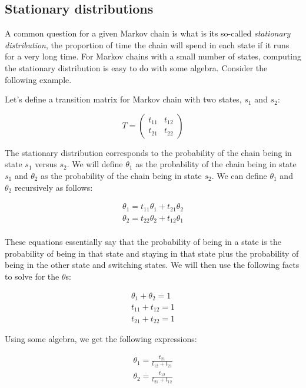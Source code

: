 \documentclass[
  letterpaper,
  DIV=11,
  numbers=noendperiod]{scrreprt}
\begin{document}
\subsection{Stationary distributions}\label{stationary-distributions}

A common question for a given Markov chain is what is its so-called
\emph{stationary distribution}, the proportion of time the chain will
spend in each state if it runs for a very long time. For Markov chains
with a small number of states, computing the stationary distribution is
easy to do with some algebra. Consider the following example.

Let's define a transition matrix for Markov chain with two states,
\(s_1\) and \(s_2\):

\[
\begin{equation}
T = \left(
\begin{matrix}
t_{11} & t_{12} \\
t_{21} & t_{22}
\end{matrix} \right)
\end{equation}
\]

The stationary distribution corresponds to the probability of the chain
being in state \(s_1\) versus \(s_2\). We will define \(\theta_1\) as
the probability of the chain being in state \(s_1\) and \(\theta_2\) as
the probability of the chain being in state \(s_2\). We can define
\(\theta_1\) and \(\theta_2\) recursively as follows:

\[
\begin{eqnarray}
\theta_1 = t_{11} \theta_1 + t_{21} \theta_2 \\
\theta_2 = t_{22} \theta_2 + t_{12} \theta_1 \\
\end{eqnarray}
\]

These equations essentially say that the probability of being in a state
is the probability of being in that state and staying in that state plus
the probability of being in the other state and switching states. We
will then use the following facts to solve for the \(\theta\)s:

\[
\begin{eqnarray}
\theta_1 + \theta_2 = 1 \\
t_{11} + t_{12} = 1 \\
t_{21} + t_{22} = 1
\end{eqnarray}
\]

Using some algebra, we get the following expressions:

\[
\begin{eqnarray}
\theta_1 = \frac{t_{21}}{t_{12}+t_{21}} \\
\theta_2 = \frac{t_{12}}{t_{21}+t_{12}}
\end{eqnarray}
\]
\end{document}
